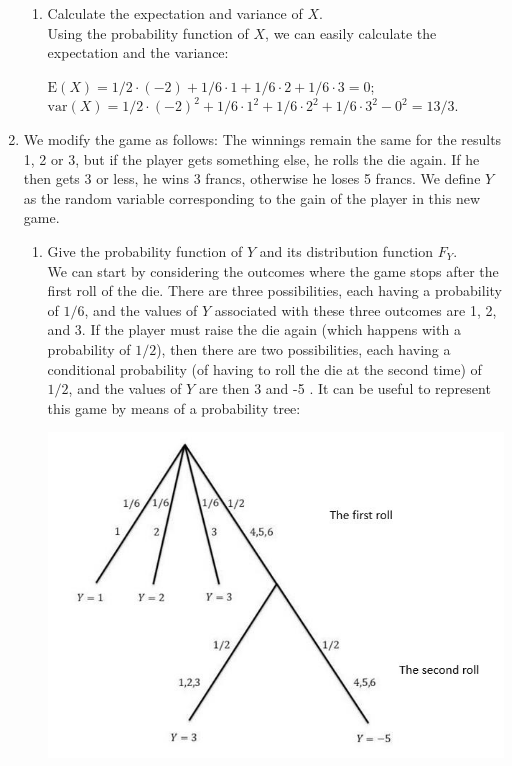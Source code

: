 \documentclass[12pt,thmsa]{article}
\begin{document}
\begin{enumerate}
\begin{enumerate}
\item Calculate the expectation and variance of $X$.\\

Using the probability function of $ X $, we can easily calculate the expectation and the variance:

\begin{center}
$\mbox{E}(X) = 1/2\cdot (-2) + 1/6 \cdot 1 + 1/6 \cdot 2+1/6 \cdot 3=0$; \\
$\mbox{var}(X) =  1/2\cdot (-2)^2 + 1/6 \cdot 1^2 + 1/6 \cdot 2^2+1/6 \cdot 3^2-0^2=13/3.$
\end{center}
\end{enumerate}

\item We modify the game as follows: The winnings remain the same for the results 1, 2 or 3, but if the player gets something else, he rolls the die again. If he then gets 3 or less, he wins 3 francs, otherwise he loses 5 francs. We define $Y$ as the random variable corresponding to the gain of the player in this new game.

\begin{enumerate}%
\item Give the probability function of $Y$ and its distribution function $F_Y$.\\

We can start by considering the outcomes where the game stops after the first roll of the die. There are three possibilities, each having a probability of $1/6$, and the values of $ Y $ associated with these three outcomes are 1, 2, and 3. If the player must raise the die again (which happens with a probability of $ 1/2$), then there are two possibilities, each having a conditional probability (of having to roll the die at the second time) of $ 1/2$, and the values of $ Y $ are then 3 and -5 . It can be useful to represent this game by means of a probability tree:

\begin{center}
\includegraphics[scale=0.8]{Arbre_1.jpg}
\end{center}


\end{enumerate}
\end{enumerate}
\end{document}

